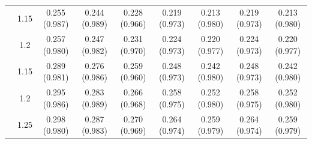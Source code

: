 \begin{tabular}{c c c c c c c c c}
 & 1.15 & 0.255 (0.987) & 0.244 (0.989) & 0.228 (0.966) & 0.219 (0.973) & 0.213 (0.980) & 0.219 (0.973) & 0.213 (0.980) \\
 & 1.2 & 0.257 (0.980) & 0.247 (0.982) & 0.231 (0.970) & 0.224 (0.973) & 0.220 (0.977) & 0.224 (0.973) & 0.220 (0.977) \\
\addlinespace
3.5 & 1.15 & 0.289 (0.981) & 0.276 (0.986) & 0.259 (0.960) & 0.248 (0.973) & 0.242 (0.980) & 0.248 (0.973) & 0.242 (0.980) \\
 & 1.2 & 0.295 (0.986) & 0.283 (0.989) & 0.266 (0.968) & 0.258 (0.975) & 0.252 (0.980) & 0.258 (0.975) & 0.252 (0.980) \\
 & 1.25 & 0.298 (0.980) & 0.287 (0.983) & 0.270 (0.969) & 0.264 (0.974) & 0.259 (0.979) & 0.264 (0.974) & 0.259 (0.979) \\
\bottomrule
\end{tabular}
